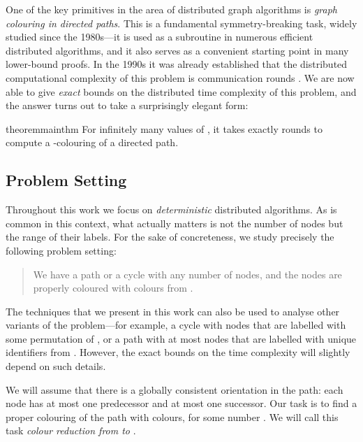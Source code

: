 \documentclass[a4paper,11pt]{article}
\theoremstyle{remark}
\begin{document}
One of the key primitives in the area of distributed graph algorithms is \emph{graph colouring in directed paths}. This is a fundamental symmetry-breaking task, widely studied since the 1980s---it is used as a subroutine in numerous efficient distributed algorithms, and it also serves as a convenient starting point in many lower-bound proofs. In the 1990s it was already established that the distributed computational complexity of this problem is  communication rounds \cite{cole86deterministic,linial92locality}. We are now able to give \emph{exact} bounds on the distributed time complexity of this problem, and the answer turns out to take a surprisingly elegant form:

\begin{restatable}{theorem}{mainthm}\label{thm:main}
    For infinitely many values of , it takes exactly  rounds to compute a -colouring of a directed path.
\end{restatable}


\subsection{Problem Setting}

Throughout this work we focus on \emph{deterministic} distributed algorithms. As is common in this context, what actually matters is not the number of nodes but the range of their labels. For the sake of concreteness, we study precisely the following problem setting:
\begin{quote}
    We have a path or a cycle with any number of nodes, and the nodes are properly coloured with colours from .
\end{quote}
The techniques that we present in this work can also be used to analyse other variants of the problem---for example, a cycle with  nodes that are labelled with some permutation of , or a path with at most  nodes that are labelled with unique identifiers from . However, the exact bounds on the time complexity will slightly depend on such details.

We will assume that there is a globally consistent orientation in the path: each node has at most one predecessor and at most one successor. Our task is to find a proper colouring of the path with  colours, for some number . We will call this task \emph{colour reduction from  to }.
\end{document}
